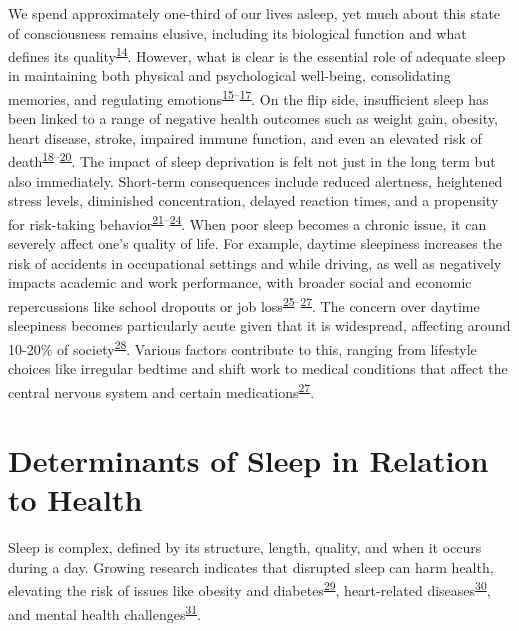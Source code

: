 \documentclass[
  10pt,
]{scrbook}
\begin{document}
We spend approximately one-third of our lives asleep, yet much about
this state of consciousness remains elusive, including its biological
function and what defines its
quality\textsuperscript{\protect\hyperlink{ref-ma_sleep_2017}{14}}.
However, what is clear is the essential role of adequate sleep in
maintaining both physical and psychological well-being, consolidating
memories, and regulating
emotions\textsuperscript{\protect\hyperlink{ref-worley_2018}{15}--\protect\hyperlink{ref-scott_2021}{17}}.
On the flip side, insufficient sleep has been linked to a range of
negative health outcomes such as weight gain, obesity, heart disease,
stroke, impaired immune function, and even an elevated risk of
death\textsuperscript{\protect\hyperlink{ref-consensus_conference_panel_recommended_2015}{18}--\protect\hyperlink{ref-hale_2020}{20}}.
The impact of sleep deprivation is felt not just in the long term but
also immediately. Short-term consequences include reduced alertness,
heightened stress levels, diminished concentration, delayed reaction
times, and a propensity for risk-taking
behavior\textsuperscript{\protect\hyperlink{ref-shochat_2014}{21}--\protect\hyperlink{ref-bonnet_1985}{24}}.
When poor sleep becomes a chronic issue, it can severely affect one's
quality of life. For example, daytime sleepiness increases the risk of
accidents in occupational settings and while driving, as well as
negatively impacts academic and work performance, with broader social
and economic repercussions like school dropouts or job
loss\textsuperscript{\protect\hyperlink{ref-connor_2002}{25}--\protect\hyperlink{ref-roth_1996}{27}}.
The concern over daytime sleepiness becomes particularly acute given
that it is widespread, affecting around 10-20\% of
society\textsuperscript{\protect\hyperlink{ref-wang_2019}{28}}. Various
factors contribute to this, ranging from lifestyle choices like
irregular bedtime and shift work to medical conditions that affect the
central nervous system and certain
medications\textsuperscript{\protect\hyperlink{ref-roth_1996}{27}}.

\hypertarget{determinants-of-sleep-in-relation-to-health}{%
\section{Determinants of Sleep in Relation to
Health}\label{determinants-of-sleep-in-relation-to-health}}

Sleep is complex, defined by its structure, length, quality, and when it
occurs during a day. Growing research indicates that disrupted sleep can
harm health, elevating the risk of issues like obesity and
diabetes\textsuperscript{\protect\hyperlink{ref-reutrakul_2018}{29}},
heart-related
diseases\textsuperscript{\protect\hyperlink{ref-cappuccio_sleep_2010}{30}},
and mental health
challenges\textsuperscript{\protect\hyperlink{ref-jouxe3o_2018}{31}}.
\end{document}
